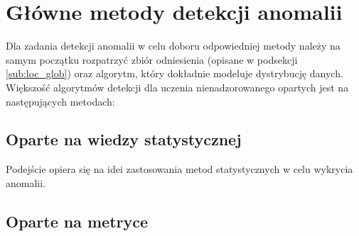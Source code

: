 

\section{Główne metody detekcji anomalii}
Dla zadania detekcji anomalii w celu doboru odpowiedniej metody należy na samym początku rozpatrzyć zbiór odniesienia (opisane w podsekcji \ref{sub:loc_glob}) oraz algorytm, który dokładnie modeluje dystrybucję danych. Większość algorytmów detekcji dla uczenia nienadzorowanego opartych jest na następujących metodach:
    \subsection {Oparte na wiedzy statystycznej}
    Podejście opiera się na idei zastosowania metod statystycznych w celu wykrycia anomalii.
    \subsection {Oparte na metryce}
